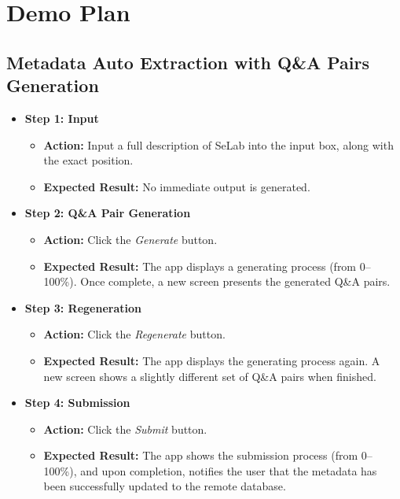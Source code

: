 \section{Demo Plan}
\subsection{Metadata Auto Extraction with Q\&A Pairs Generation}
\begin{itemize}
    \item \textbf{Step 1: Input}
    \begin{itemize}
        \item \textbf{Action:} Input a full description of SeLab into the input box, along with the exact position.
        \item \textbf{Expected Result:} No immediate output is generated.
    \end{itemize}
    
    \item \textbf{Step 2: Q\&A Pair Generation}
    \begin{itemize}
        \item \textbf{Action:} Click the \emph{Generate} button.
        \item \textbf{Expected Result:} The app displays a generating process (from 0--100\%). Once complete, a new screen presents the generated Q\&A pairs.
    \end{itemize}
    
    \item \textbf{Step 3: Regeneration}
    \begin{itemize}
        \item \textbf{Action:} Click the \emph{Regenerate} button.
        \item \textbf{Expected Result:} The app displays the generating process again. A new screen shows a slightly different set of Q\&A pairs when finished.
    \end{itemize}
    
    \item \textbf{Step 4: Submission}
    \begin{itemize}
        \item \textbf{Action:} Click the \emph{Submit} button.
        \item \textbf{Expected Result:} The app shows the submission process (from 0--100\%), and upon completion, notifies the user that the metadata has been successfully updated to the remote database.
    \end{itemize}
\end{itemize}

